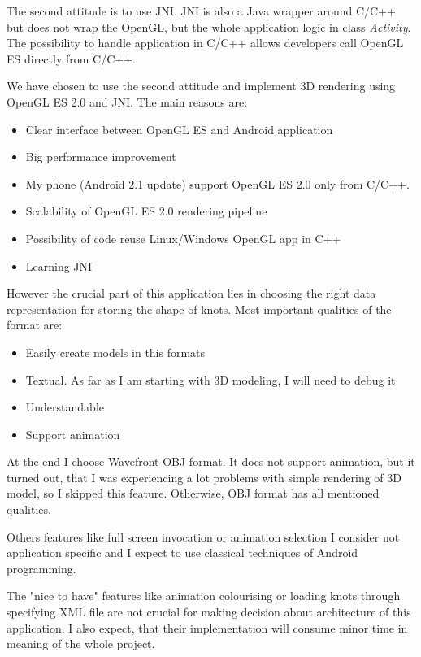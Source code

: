 The second attitude is to use JNI. JNI is also a Java wrapper around C/C++ but does not wrap the OpenGL,
but the whole application logic in class {\it Activity}. 
The possibility to handle application in C/C++ allows developers call OpenGL ES directly from C/C++.

We have chosen to use the second attitude and implement 3D rendering using OpenGL ES 2.0 and JNI.
The main reasons are:
\begin{itemize}
  \item Clear interface between OpenGL ES and Android application
  \item Big performance improvement
  \item My phone (Android 2.1 update) support OpenGL ES 2.0 only from C/C++.
  \item Scalability of OpenGL ES 2.0 rendering pipeline 
  \item Possibility of code reuse Linux/Windows OpenGL app in C++
  \item Learning JNI
\end{itemize}

However the crucial part of this application lies 
in choosing the right data representation for storing the shape of knots.
Most important qualities of the format are:
\begin{itemize}
    \item Easily create models in this formats
    \item Textual. As far as I am starting with 3D modeling, 
    I will need to debug it
    \item Understandable
    \item Support animation
\end{itemize}

At the end I choose Wavefront OBJ format. It does not support animation, but it turned out,
that I was experiencing a lot problems with simple rendering of 3D model,
so I skipped this feature. Otherwise, OBJ format has all mentioned qualities.

Others features like full screen invocation or animation selection
I consider not application specific and I expect
to use classical techniques of Android programming.

The "nice to have" features like animation colourising 
or loading knots through specifying XML file are not crucial 
for making decision about architecture of this application. 
I also expect, that their implementation will consume minor time
in meaning of the whole project.


